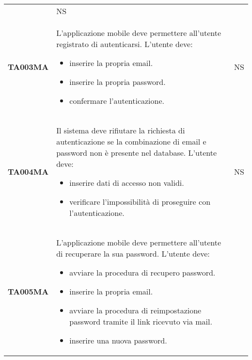 \documentclass[../../piano-di-qualifica.tex]{subfiles}
\begin{document}
\begin{longtable}[H]{>{\centering\bfseries}m{3cm} >{}m{10cm} >{\centering\arraybackslash}m{3cm}}
                    & NS                                                                                                                                                                                                                                                               \\
  TA003MA           & L'applicazione mobile deve permettere all'utente registrato di autenticarsi. \newline
  L'utente deve:
  \begin{itemize}
    \item inserire la propria email.
    \item inserire la propria password.
    \item confermare l'autenticazione.
  \end{itemize}
                    & NS                                                                                                                                                                                                                                                               \\
  TA004MA           & Il sistema deve rifiutare la richiesta di autenticazione se la combinazione di email e password non è presente nel database. \newline
  L'utente deve:
  \begin{itemize}
    \item inserire dati di accesso non validi.
    \item verificare l'impossibilità di proseguire con l'autenticazione.
  \end{itemize}
                    & NS                                                                                                                                                                                                                                                               \\
  TA005MA           & L'applicazione mobile deve permettere all'utente di recuperare la sua password. \newline
  L'utente deve:
  \begin{itemize}
    \item avviare la procedura di recupero password.
    \item inserire la propria email.
    \item avviare la procedura di reimpostazione password tramite il link ricevuto via mail.
    \item inserire una nuova password.

\end{itemize}
\end{longtable}
\end{document}
